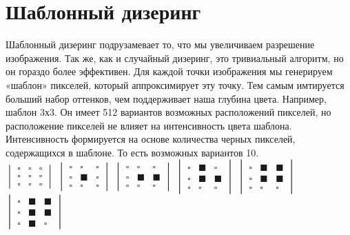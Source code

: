 \section{Шаблонный дизеринг}

Шаблонный дизеринг подрузамевает то, что мы увеличиваем разрешение изображения. Так же, как и случайный дизеринг, это тривиальный алгоритм, но он гораздо более эффективен.\cite{Ulich}
Для каждой точки изображения мы генерируем «шаблон» пикселей, который аппроксимирует эту точку. Тем  самым  имтируется больший набор оттенков, чем поддерживает наша глубина цвета.
Например, шаблон 3х3. Он имеет 512 вариантов возможных расположений пикселей, но расположение пикселей не влияет на интенсивность цвета шаблона. Интенсивность формируется на основе количества черных пикселей, содержащихся в шаблоне. То есть возможных вариантов 10. \\
$\begin{vmatrix}
\square&\square&\square \\
\square &\square&\square \\
\square &\square&\square 
\end{vmatrix}$
$\begin{vmatrix}
\square&\square&\square \\
\square &\blacksquare&\square \\
\square &\square&\square 
\end{vmatrix}$ 
$\begin{vmatrix}
\square&\square&\square \\
\square &\blacksquare&\blacksquare \\
\square &\square&\square 
\end{vmatrix}$ 
$\begin{vmatrix}
\square&\blacksquare&\square \\
\square &\blacksquare&\blacksquare \\
\square &\square&\square 
\end{vmatrix}$ 
$\begin{vmatrix}
\square&\blacksquare&\blacksquare \\
\square &\blacksquare&\blacksquare \\
\square &\square&\square 
\end{vmatrix}$ \\
$\begin{vmatrix}
\square&\blacksquare&\blacksquare \\
\square &\blacksquare&\blacksquare \\
\square &\blacksquare&\square 
\end{vmatrix}$ 
